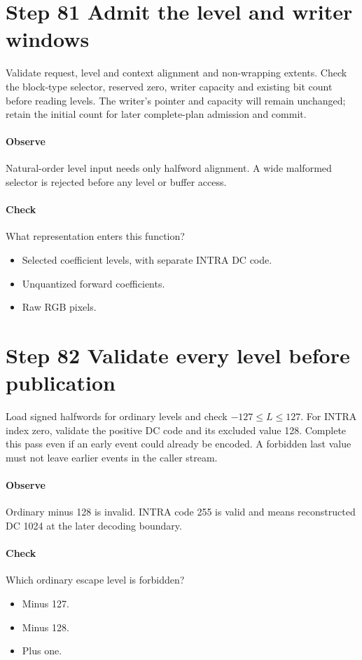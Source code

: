 \section{Step 81 Admit the level and writer windows}\label{h263-coeff-s01}
Validate request, level and context alignment and non-wrapping extents. Check the
block-type selector, reserved zero, writer capacity and existing bit count before
reading levels. The writer's pointer and capacity will remain unchanged; retain
the initial count for later complete-plan admission and commit.

\paragraph{Observe} Natural-order level input needs only halfword alignment.
A wide malformed selector is rejected before any level or buffer access.
\paragraph{Check} What representation enters this function?
\begin{itemize}
  \item[A.] Selected coefficient levels, with separate INTRA DC code.
  \item[B.] Unquantized forward coefficients.
  \item[C.] Raw RGB pixels.
\end{itemize}

\section{Step 82 Validate every level before publication}\label{h263-coeff-s02}
Load signed halfwords for ordinary levels and check $-127\leq L\leq127$.
For INTRA index zero, validate the positive DC code and its excluded value 128.
Complete this pass even if an early event could already be encoded. A forbidden
last value must not leave earlier events in the caller stream.

\paragraph{Observe} Ordinary minus 128 is invalid. INTRA code 255 is valid and
means reconstructed DC 1024 at the later decoding boundary.
\paragraph{Check} Which ordinary escape level is forbidden?
\begin{itemize}
  \item[A.] Minus 127.
  \item[B.] Minus 128.
  \item[C.] Plus one.
\end{itemize}

